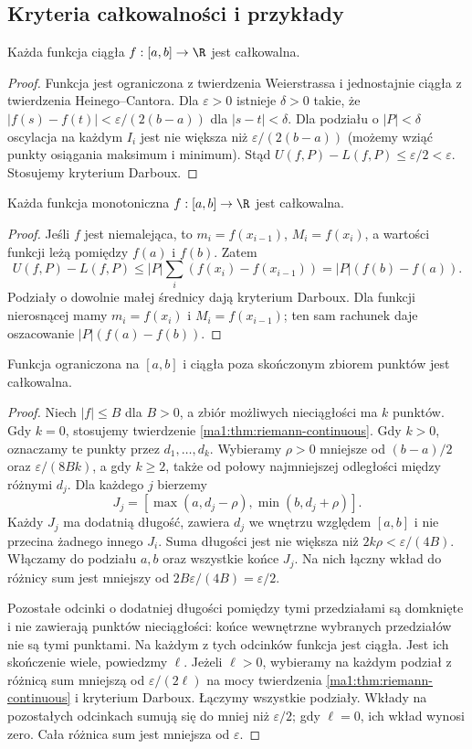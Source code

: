 \subsection{Kryteria całkowalności i przykłady}
\begin{twierdzenie}
\label{ma1:thm:riemann-continuous}
Każda funkcja ciągła $f:[a,b]\to\R$ jest całkowalna.
\end{twierdzenie}
\begin{proof}
Funkcja jest ograniczona z twierdzenia Weierstrassa i jednostajnie ciągła z twierdzenia Heinego--Cantora. Dla $\varepsilon>0$ istnieje $\delta>0$ takie, że $|f(s)-f(t)|<\varepsilon/(2(b-a))$ dla $|s-t|<\delta$. Dla podziału o $|P|<\delta$ oscylacja na każdym $I_i$ jest nie większa niż $\varepsilon/(2(b-a))$ (możemy wziąć punkty osiągania maksimum i minimum). Stąd $U(f,P)-L(f,P)\le\varepsilon/2<\varepsilon$. Stosujemy kryterium Darboux.
\end{proof}
\begin{twierdzenie}
\label{ma1:thm:riemann-monotone}
Każda funkcja monotoniczna $f:[a,b]\to\R$ jest całkowalna.
\end{twierdzenie}
\begin{proof}
Jeśli $f$ jest niemalejąca, to $m_i=f(x_{i-1})$, $M_i=f(x_i)$, a wartości funkcji leżą pomiędzy $f(a)$ i $f(b)$. Zatem
\[
 U(f,P)-L(f,P)\le |P|\sum_i(f(x_i)-f(x_{i-1}))
 =|P|(f(b)-f(a)).
\]
Podziały o dowolnie małej średnicy dają kryterium Darboux. Dla funkcji nierosnącej mamy $m_i=f(x_i)$ i $M_i=f(x_{i-1})$; ten sam rachunek daje oszacowanie $|P|(f(a)-f(b))$.
\end{proof}
\begin{twierdzenie}
\label{ma1:thm:riemann-finite-discontinuities}
Funkcja ograniczona na $[a,b]$ i ciągła poza skończonym zbiorem punktów jest całkowalna.
\end{twierdzenie}
\begin{proof}
Niech $|f|\le B$ dla $B>0$, a zbiór możliwych nieciągłości ma $k$ punktów. Gdy $k=0$, stosujemy twierdzenie \ref{ma1:thm:riemann-continuous}. Gdy $k>0$, oznaczamy te punkty przez $d_1,\ldots,d_k$. Wybieramy $\rho>0$ mniejsze od $(b-a)/2$ oraz $\varepsilon/(8Bk)$, a gdy $k\ge2$, także od połowy najmniejszej odległości między różnymi $d_j$. Dla każdego $j$ bierzemy
\[
 J_j=[\max(a,d_j-\rho),\min(b,d_j+\rho)].
\]
Każdy $J_j$ ma dodatnią długość, zawiera $d_j$ we wnętrzu względem $[a,b]$ i nie przecina żadnego innego $J_i$. Suma długości jest nie większa niż $2k\rho<\varepsilon/(4B)$. Włączamy do podziału $a,b$ oraz wszystkie końce $J_j$. Na nich łączny wkład do różnicy sum jest mniejszy od $2B\varepsilon/(4B)=\varepsilon/2$.

Pozostałe odcinki o dodatniej długości pomiędzy tymi przedziałami są domknięte i nie zawierają punktów nieciągłości: końce wewnętrzne wybranych przedziałów nie są tymi punktami. Na każdym z tych odcinków funkcja jest ciągła. Jest ich skończenie wiele, powiedzmy $\ell$. Jeżeli $\ell>0$, wybieramy na każdym podział z różnicą sum mniejszą od $\varepsilon/(2\ell)$ na mocy twierdzenia \ref{ma1:thm:riemann-continuous} i kryterium Darboux. Łączymy wszystkie podziały. Wkłady na pozostałych odcinkach sumują się do mniej niż $\varepsilon/2$; gdy $\ell=0$, ich wkład wynosi zero. Cała różnica sum jest mniejsza od $\varepsilon$.
\end{proof}
